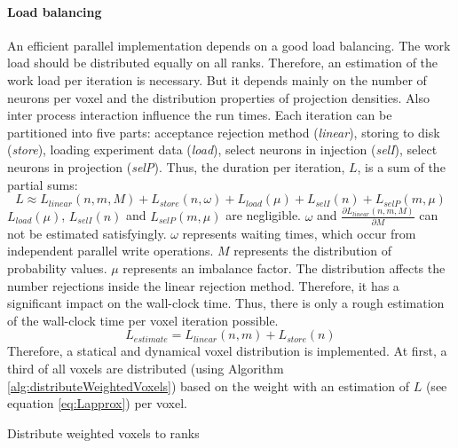 \paragraph{Load balancing}
\label{par:loadbalancing}
An efficient parallel implementation depends on a good load balancing.
The work load should be distributed equally on all ranks.
Therefore, an estimation of the work load per iteration is necessary.
But it depends mainly on the number of neurons per voxel and the distribution properties of projection densities.
Also inter process interaction influence the run times.
Each iteration can be partitioned into five parts: acceptance rejection method (\emph{linear}), storing to disk (\emph{store}),
loading experiment data (\emph{load}), select neurons in injection (\emph{selI}), select neurons in projection (\emph{selP}).
Thus, the duration per iteration, $L$, is a sum of the partial sums:
\begin{equation} \label{eq:L}
	L \approx L_{linear}(n,m,M) + L_{store}(n,\omega) + L_{load}(\mu) + L_{selI}(n) + L_{selP}(m,\mu)
\end{equation}
$L_{load}(\mu)$, $L_{selI}(n)$ and $L_{selP}(m,\mu)$ are negligible.
$\omega$ and $\frac{\partial L_{linear}(n,m,M)}{\partial M}$  can not be estimated satisfyingly.
$\omega$ represents waiting times, which occur from independent parallel write operations.
$M$ represents the distribution of probability values.
$\mu$ represents an imbalance factor.
The distribution affects the number rejections inside the linear rejection method.
Therefore, it has a significant impact on the wall-clock time.
Thus, there is only a rough estimation of the wall-clock time per voxel iteration possible.
\begin{equation} \label{eq:Lapprox}
	L_{estimate} = L_{linear}(n,m) + L_{store}(n)
\end{equation}
Therefore, a statical and dynamical voxel distribution is implemented.
At first, a third of all voxels are distributed (using Algorithm \ref{alg:distributeWeightedVoxels}) based on the weight with an estimation
of $L$ (see equation \ref{eq:Lapprox})  per voxel.
\begin{algorithm}[ht!]
\caption{Distribute weighted voxels to ranks}
\label{alg:distributeWeightedVoxels}
\end{algorithm}

